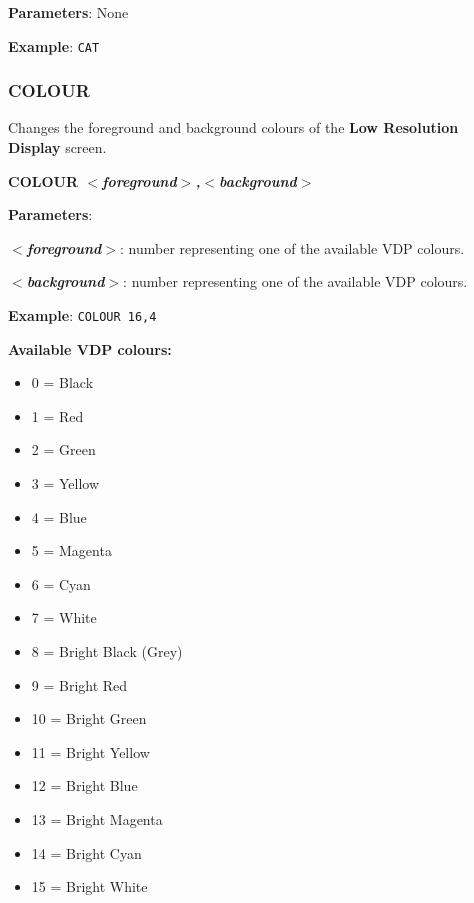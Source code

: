         \textbf{Parameters}: None

        \textbf{Example}: \texttt{CAT}

        \subsubsection{{COLOUR}}
        Changes the foreground and background colours of the \textbf{Low
        Resolution Display} screen.

        \hspace{1.9cm}\textbf{COLOUR \textit{$<$foreground$>$,$<$background$>$}}

        \textbf{Parameters}:

        \hspace{1cm}\textbf{\textit{$<$foreground$>$}}: number representing one
        of the available VDP colours.

        \hspace{1cm}\textbf{\textit{$<$background$>$}}: number representing one
        of the available VDP colours.

        \textbf{Example}: \texttt{COLOUR 16,4}

        \textbf{Available VDP colours:}

        \begin{itemize}
            \item 0 = Black
            \item 1 = Red
            \item 2 = Green
            \item 3 = Yellow
            \item 4 = Blue
            \item 5 = Magenta
            \item 6 = Cyan
            \item 7 = White
            \item 8 = Bright Black (Grey)
            \item 9 = Bright Red
            \item 10 = Bright Green
            \item 11 = Bright Yellow
            \item 12 = Bright Blue
            \item 13 = Bright Magenta
            \item 14 = Bright Cyan
            \item 15 = Bright White
        \end{itemize}

